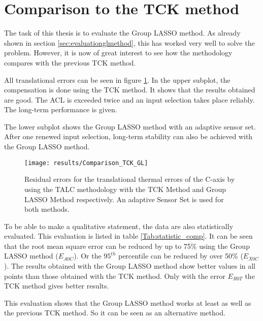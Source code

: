 \section{Comparison to the TCK method}
\label{sec:comparisonTCK}

The task of this thesis is to evaluate the Group LASSO method. As already shown in section \ref{sec:evaluationglmethod}, this has worked very well to solve the problem. However, it is now of great interest to see how the methodology compares with the previous TCK method.

All translational errors can be seen in figure \ref{fig:all_methods}. In the upper subplot, the compensation is done using the TCK method. It shows that the results obtained are good. The ACL is exceeded twice and an input selection takes place reliably. The long-term performance is given. 

The lower subplot shows the Group LASSO method with an adaptive sensor set. After one renewed input selection, long-term stability can also be achieved with the Group LASSO method.


\begin{figure}[!htb]
    \centering
    \texttt{[image: results/Comparison\_TCK\_GL]} %
    \caption[Deviations - All methods]{Residual errors for the translational thermal errors of the C-axis by using the TALC methodology with the TCK Method and Group LASSO Method respectively. An adaptive Sensor Set is used for both methods.}
    \label{fig:all_methods}
\end{figure}

To be able to make a qualitative statement, the data are also statistically evaluated. This evaluation is listed in table \ref{Tab:statistic_comp}. It can be seen that the root mean square error can be reduced by up to 75\% using the Group LASSO method ($E_{A0C}$). Or the $95^{th}$ percentile can be reduced by over 50\% ($E_{X0C}$). The results obtained with the Group LASSO method show better values in all points than those obtained with the TCK method. Only with the error $E_{R0T}$ the TCK method gives better results.

This evaluation shows that the Group LASSO method works at least as well as the previous TCK method. So it can be seen as an alternative method.


